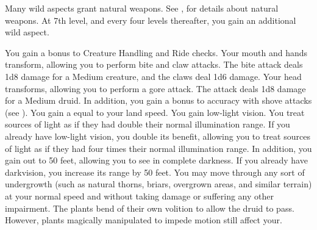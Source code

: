             Many wild aspects grant natural weapons.
            See , for details about natural weapons.
            At 7th level, and every four levels thereafter, you gain an additional wild aspect.

            You gain a  bonus to Creature Handling and Ride checks.
            Your mouth and hands transform, allowing you to perform bite and claw attacks.
            The bite attack deals 1d8 damage for a Medium creature, and the claws deal 1d6 damage.
            Your head transforms, allowing you to perform a gore attack.
            The attack deals 1d8 damage for a Medium druid.
            In addition, you gain a  bonus to accuracy with shove attacks (see ).
            You gain a  equal to your land speed.
            You gain low-light vision.
            You treat sources of light as if they had double their normal illumination range.
            If you already have low-light vision, you double its benefit, allowing you to treat sources of light as if they had four times their normal illumination range.
            In addition, you gain  out to 50 feet, allowing you to see in complete darkness.
            If you already have darkvision, you increase its range by 50 feet.
            You may move through any sort of undergrowth (such as natural thorns, briars, overgrown areas, and similar terrain) at your normal speed and without taking damage or suffering any other impairment.
            The plants bend of their own volition to allow the druid to pass.
            However, plants magically manipulated to impede motion still affect your.

